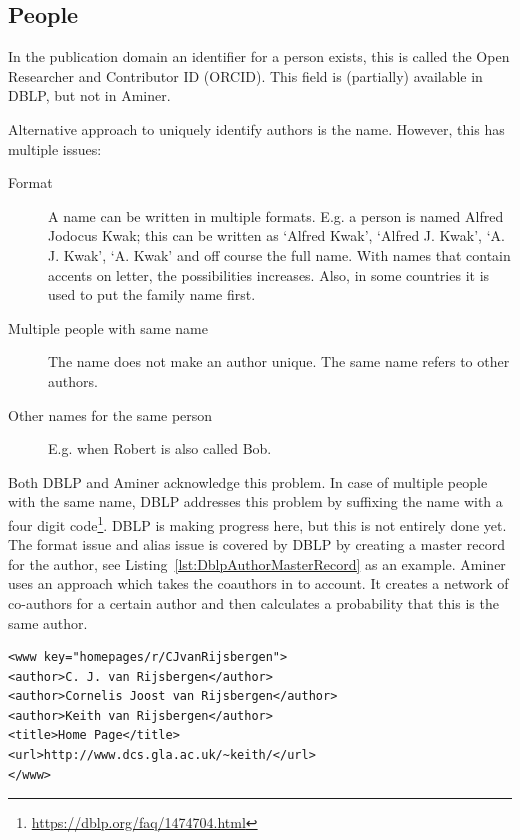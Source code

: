 \documentclass{ou-report}
\newcommand{\dblp}{DBLP}
\newcommand{\orcid}{ORCID}
\begin{document}
\subsection{People}
\label{sec:integrability_people}
In the publication domain an identifier for a person exists, this is called
the Open Researcher and Contributor ID (\orcid{}). This field is (partially) 
available in \dblp{}, but not in Aminer.

Alternative approach to uniquely identify authors is the name. However, this has
multiple issues:
\begin{description}
    \item[Format] A name can be written in multiple formats. E.g. a person is 
    named Alfred Jodocus Kwak; this can be written as `Alfred Kwak', 
    `Alfred J. Kwak', `A. J. Kwak', `A. Kwak' and off course the full name. 
    With names that contain accents on letter, the possibilities increases.
    Also, in some countries it is used to put the family name first.
    \item[Multiple people with same name] The name does not make an author 
    unique. The same name refers to other authors. 
    \item[Other names for the same person] E.g. when Robert is also called Bob.
\end{description}

Both DBLP and Aminer acknowledge this problem. In case of multiple 
people with the same name, DBLP addresses this problem by suffixing the
name with a four digit code\footnote{\url{https://dblp.org/faq/1474704.html}}.
\dblp{} is making progress here, but this is not entirely done yet. 
The format issue and alias issue is covered by \dblp{} by creating a master 
record for the author, see Listing~\ref{lst:DblpAuthorMasterRecord} as an 
example.
Aminer uses an approach which takes the coauthors in to account. It creates
a network of co-authors for a certain author and then calculates a 
probability that this is the same author.
\lstset{language=XML}
\begin{lstlisting}[caption={Example master record (\url{https://dblp.org/faq/1474690.html})},label={lst:DblpAuthorMasterRecord}]
<www key="homepages/r/CJvanRijsbergen">
<author>C. J. van Rijsbergen</author>
<author>Cornelis Joost van Rijsbergen</author>
<author>Keith van Rijsbergen</author>
<title>Home Page</title>
<url>http://www.dcs.gla.ac.uk/~keith/</url>
</www>
\end{lstlisting}
\end{document}
